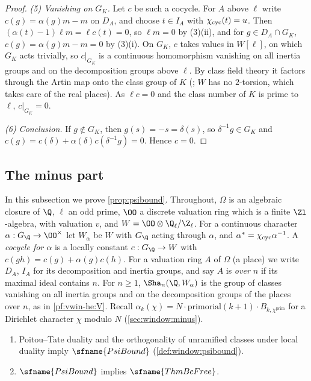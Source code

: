 \begin{proof}
\emph{(5) Vanishing on $G_K$.} Let $c$ be such a cocycle. For $A$ above $\ell$ write $c(g)=\alpha(g)m-m$ on $D_A$, and choose
$t\in I_A$ with $\chi_{\mathrm{cyc}}(t)=u$. Then $(\alpha(t)-1)\ell m=\ell c(t)=0$, so $\ell m=0$ by (3)(ii), and for $g\in D_A\cap G_K$,
$c(g)=\alpha(g)m-m=0$ by (3)(i). On $G_K$, $c$ takes values in $W[\ell]$, on which $G_K$ acts trivially, so $c|_{G_K}$ is a continuous
homomorphism vanishing on all inertia groups and on the decomposition groups above $\ell$. By class field theory it factors through the
Artin map onto the class group of $K$ (; $W$ has no $2$-torsion, which takes care of the real
places). As $\ell c=0$ and the class number of $K$ is prime to $\ell$, $c|_{G_K}=0$.

\emph{(6) Conclusion.} If $g\notin G_K$, then $g(s)=-s=\delta(s)$, so $\delta^{-1}g\in G_K$ and
$c(g)=c(\delta)+\alpha(\delta)c(\delta^{-1}g)=0$. Hence $c=0$.
\end{proof}


\subsection{The minus part}\label{sec:pf:vwin:minus}

In this subsection we prove \cref{prop:psibound}. Throughout, $\Omega$ is an algebraic closure of $\Q$, $\ell$ an odd prime, $\OO$ a
discrete valuation ring which is a finite $\Zl$-algebra, with valuation $v$, and $W=\OO\otimes\vwinQZ$. For a continuous character
$\alpha:G_\Q\to\OO^\times$ let $W_\alpha$ be $W$ with $G_\Q$ acting through $\alpha$, and $\alpha^*=\chi_{\mathrm{cyc}}\alpha^{-1}$. A
\emph{cocycle for $\alpha$} is a locally constant $c:G_\Q\to W$ with $c(gh)=c(g)+\alpha(g)c(h)$. For a valuation ring $A$ of $\Omega$
(a place) we write $D_A$, $I_A$ for its decomposition and inertia groups, and say $A$ is \emph{over $n$} if its maximal ideal contains
$n$. For $n\ge1$, $\Sha_n(\Q,W_\alpha)$ is the group of classes vanishing on all inertia groups and on the decomposition groups of the
places over $n$, as in \cref{pf:vwin-he:V}. Recall $\alpha_k(\chi)=N\cdot\mathrm{primorial}(k+1)\cdot B_{k,\chi^{\mathrm{prim}}}$ for a
Dirichlet character $\chi$ modulo $N$ (\cref{sec:window:minus}).

\begin{proposition}\label{pf:vwin:psibound}
\begin{enumerate}[label=(\roman*)]
\item Poitou--Tate duality and the orthogonality of unramified classes under local duality imply $\sfname{PsiBound}$
(\cref{def:window:psibound}).
\item $\sfname{PsiBound}$ implies $\sfname{ThmBcFree}$.
\end{enumerate}
\end{proposition}

